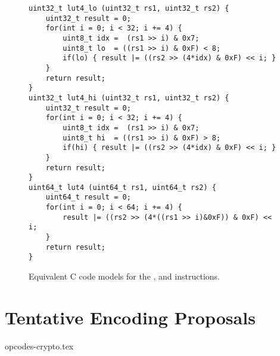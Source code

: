 \begin{figure}[h]
\begin{lstlisting}[style=C]
uint32_t lut4_lo (uint32_t rs1, uint32_t rs2) {
    uint32_t result = 0;
    for(int i = 0; i < 32; i += 4) {
        uint8_t idx =  (rs1 >> i) & 0x7;
        uint8_t lo  = ((rs1 >> i) & 0xF) < 8;
        if(lo) { result |= ((rs2 >> (4*idx) & 0xF) << i; }
    }
    return result;
}
uint32_t lut4_hi (uint32_t rs1, uint32_t rs2) {
    uint32_t result = 0;
    for(int i = 0; i < 32; i += 4) {
        uint8_t idx =  (rs1 >> i) & 0x7;
        uint8_t hi  = ((rs1 >> i) & 0xF) > 8;
        if(hi) { result |= ((rs2 >> (4*idx) & 0xF) << i; }
    }
    return result;
}
uint64_t lut4 (uint64_t rs1, uint64_t rs2) {
    uint64_t result = 0;
    for(int i = 0; i < 64; i += 4) {
        result |= ((rs2 >> (4*((rs1 >> i)&0xF)) & 0xF) << i;
    }
    return result;
}
\end{lstlisting}
\caption{
    Equivalent C code models for the
    ,  and 
    instructions.
}
\label{fig:equiv:c:lut4}
\end{figure}


\newpage
\section{Tentative Encoding Proposals}


{opcodes-crypto.tex}


